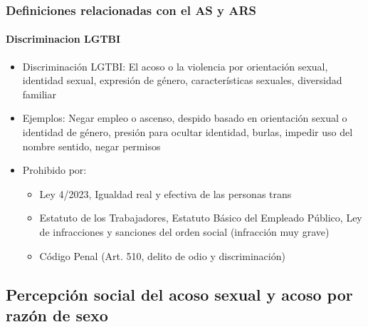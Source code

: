 \documentclass{beamer}
\newcommand{\highlight}[1]{{\color{Blue} #1}}
\begin{document}
    \begin{frame}
        \frametitle{Definiciones relacionadas con el AS y ARS}
        \framesubtitle{Discriminacion LGTBI}
        \begin{itemize}
            \item \highlight{Discriminación LGTBI}: El acoso o la violencia por orientación sexual, identidad sexual, expresión de género, características sexuales, diversidad familiar
            \item \highlight{Ejemplos}: Negar empleo o ascenso, despido basado en orientación sexual o identidad de género, presión para ocultar identidad, burlas, impedir uso del nombre sentido, negar permisos
            \item \highlight{Prohibido} por:
            \begin{itemize}
                \item Ley 4/2023, Igualdad real y efectiva de las personas trans
                \item Estatuto de los Trabajadores, Estatuto Básico del Empleado Público, Ley de infracciones y sanciones del orden social (infracción muy grave)
                \item Código Penal (Art. 510, delito de odio y discriminación)
            \end{itemize}
        \end{itemize}
    \end{frame}

    \subsection{Percepción social del acoso sexual y acoso por razón de sexo}
\end{document}
